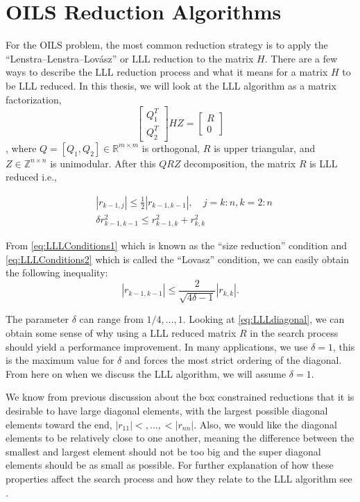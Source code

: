 \documentclass[12pt,Bold,letterpaper]{mcgilletdclass}
\newcommand{\vsp}{\vspace{\baselineskip}}
\begin{document}
\vsp \section{OILS Reduction Algorithms}
For the OILS problem, the most common reduction strategy is to apply the ``Lenstra–Lenstra–Lovász'' or LLL reduction \cite{LenLL82} to the matrix $H$. There are a few ways to describe the LLL reduction process and what it means for a matrix $H$ to be LLL reduced. In this thesis, we will look at the LLL algorithm as a matrix factorization, 
$$\begin{bmatrix}
Q_1^T\\ 
Q_2^T
\end{bmatrix}
HZ = 
\begin{bmatrix}
R\\ 
0
\end{bmatrix}$$,
where $Q = [Q_1, Q_2] \in \mathbb{R}^{m \times m} $ is orthogonal, $R$ is upper triangular, and $Z \in \mathbb{Z}^{n \times n}$ is unimodular. After this $QRZ$ decomposition, the matrix $R$ is LLL reduced i.e.,

\begin{align} \label{eq:LLLConditions1}
&\left | r_{k-1,j} \right | \le \frac{1}{2} \left | r_{k-1,k-1} \right |, \quad
j = k:n, k=2:n \\
\label{eq:LLLConditions2}
&\delta r_{k-1,k-1}^2 \le r_{k-1,k}^2 + r_{k,k}^2
\end{align}

From \eqref{eq:LLLConditions1} which is known as the ``size reduction''
condition and \eqref{eq:LLLConditions2} which is called the ``Lovasz''
condition, we can easily obtain the following inequality:
\begin{equation} \label{eq:LLLdiagonal}
\left | r_{k-1,k-1} \right | \le \frac{2}{\sqrt{4\delta -1}}\left | r_{k,k} \right |.
\end{equation}

The parameter $\delta$ can range from $1/4, \dots , 1$. Looking at
\eqref{eq:LLLdiagonal}, we can obtain some sense of why using a LLL reduced
matrix $R$ in the search process should yield a performance improvement. In many
applications, we use $\delta=1$, this is the maximum value for $\delta$ and
forces the most strict ordering of the diagonal. From here on when we discuss
the LLL algorithm, we will assume $\delta = 1$.

We know from previous discussion
about the box constrained reductions that it is desirable to have large diagonal
elements, with the largest possible diagonal elements toward the end, $|r_{11}|
<, \dots,< |r_{nn}|$. Also, we would like the diagonal elements to be
relatively close to one another, meaning the difference between the smallest
and largest element should not be too big and the super diagonal elements
should be as small as possible. For further explanation of how these properties
affect the search process and how they relate to the LLL algorithm see
\cite{XiAC11}.
\end{document}
